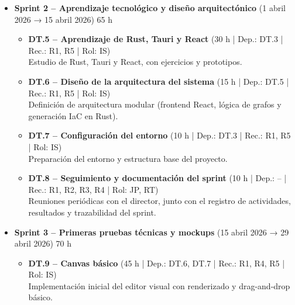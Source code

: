 \documentclass{article}
\begin{document}
{\begin{itemize}[leftmargin=*, itemsep=2pt]
            \item \textbf{Sprint 2 – Aprendizaje tecnológico y diseño arquitectónico} 
            (1 abril 2026 → 15 abril 2026) 65 h
            
            \begin{itemize}[leftmargin=1.2em, itemsep=2pt]
            
                \item \textbf{DT.5 – Aprendizaje de Rust, Tauri y React} 
                (30 h | Dep.: DT.3 | Rec.: R1, R5 | Rol: IS) \\
                Estudio de Rust, Tauri y React, con ejercicios y prototipos.
            
                \item \textbf{DT.6 – Diseño de la arquitectura del sistema} 
                (15 h | Dep.: DT.5 | Rec.: R1, R5 | Rol: IS) \\
                Definición de arquitectura modular (frontend React, lógica de grafos 
                y generación IaC en Rust).
            
                \item \textbf{DT.7 – Configuración del entorno} 
                (10 h | Dep.: DT.3 | Rec.: R1, R5 | Rol: IS) \\
                Preparación del entorno y estructura base del proyecto.
            
                \item \textbf{DT.8 – Seguimiento y documentación del sprint} 
                (10 h | Dep.: -- | Rec.: R1, R2, R3, R4 | Rol: JP, RT) \\
                Reuniones periódicas con el director, junto con el registro de 
                actividades, resultados y trazabilidad del sprint.
            
            \end{itemize}            

            \item \textbf{Sprint 3 – Primeras pruebas técnicas y mockups} 
            (15 abril 2026 → 29 abril 2026) 70 h
            
                \begin{itemize}[leftmargin=1.2em, itemsep=2pt]
            
                    \item \textbf{DT.9 – Canvas básico} 
                    (45 h | Dep.: DT.6, DT.7 | Rec.: R1, R4, R5 | Rol: IS) \\
                    Implementación inicial del editor visual con renderizado y 
                    drag-and-drop básico.
            

\end{itemize}
\end{itemize}}
\end{document}
